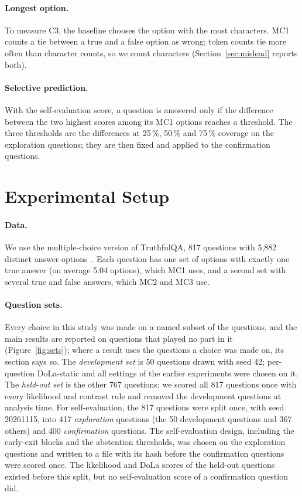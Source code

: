 \documentclass[11pt]{article}
\newcommand{\cha}[1]{\textsf{C#1}}
\newcommand{\method}{per-question DoLa-static}
\begin{document}
\paragraph{Longest option.}
To measure \cha3, the baseline chooses the option with the most characters. MC1 counts a tie between a true and
a false option as wrong; token counts tie more often than character counts, so we count characters
(Section~\ref{sec:mislead} reports both).

\paragraph{Selective prediction.}
With the self-evaluation score, a question is answered only if the difference between the two highest scores among
its MC1 options reaches a threshold. The three thresholds are the differences at 25\,\%, 50\,\% and 75\,\% coverage on
the exploration questions; they are then fixed and applied to the confirmation questions.

\section{Experimental Setup}
\label{sec:setup}
\paragraph{Data.}
We use the multiple-choice version of TruthfulQA, 817 questions with 5,882 distinct answer
options~\citep{lin2022truthfulqa}. Each question has one set of options with exactly one true answer (on average
5.04 options), which MC1 uses, and a second set with several true and false answers, which MC2 and MC3 use.

\paragraph{Question sets.}
Every choice in this study was made on a named subset of the questions, and the main results are reported on
questions that played no part in it (Figure~\ref{fig:sets}); where a result uses the questions a choice was made on,
its section says so. The \emph{development set} is 50 questions drawn with seed 42;
\method{} and all settings of the earlier experiments were chosen on it. The \emph{held-out set} is the other 767
questions: we scored all 817 questions once with every likelihood and contrast rule and removed the development
questions at analysis time. For self-evaluation, the 817 questions were split once, with seed 20261115, into 417
\emph{exploration} questions (the 50 development questions and 367 others) and 400 \emph{confirmation} questions. The
self-evaluation design, including the early-exit blocks and the abstention thresholds, was chosen on the
exploration questions and written to a file with its hash before the confirmation questions were scored once. The
likelihood and DoLa scores of the held-out questions existed before this split, but no self-evaluation score of a
confirmation question did.
\end{document}
